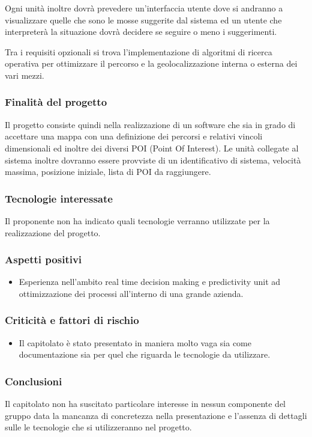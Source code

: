 			Ogni unità inoltre dovrà prevedere un’interfaccia utente dove si andranno a visualizzare quelle che sono le mosse suggerite dal sistema ed un utente che interpreterà la situazione dovrà decidere se seguire o meno i suggerimenti. 
			
			Tra i requisiti opzionali si trova l’implementazione di algoritmi di ricerca operativa per ottimizzare il percorso e la geolocalizzazione interna o esterna dei vari mezzi.
		\subsubsection{Finalità del progetto}
			Il progetto consiste quindi nella realizzazione di un software che sia in grado di accettare una mappa con una definizione dei percorsi e relativi vincoli dimensionali ed inoltre dei diversi POI (Point Of Interest). Le unità collegate al sistema inoltre dovranno essere provviste di un identificativo di sistema, velocità massima, posizione iniziale, lista di POI da raggiungere.
		\subsubsection{Tecnologie interessate}
			Il proponente non ha indicato quali tecnologie verranno utilizzate per la realizzazione del progetto.
			
		\subsubsection{Aspetti positivi}
			\begin{itemize}
				\item Esperienza nell’ambito real time decision making e predictivity unit ad ottimizzazione dei processi all’interno di una grande azienda.
 			\end{itemize}			
		\subsubsection{Criticità e fattori di rischio}
			\begin{itemize}
				\item Il capitolato è stato presentato in maniera molto vaga sia come documentazione sia per quel che riguarda le tecnologie da utilizzare.
			\end{itemize}
		\subsubsection{Conclusioni}
			Il capitolato non ha suscitato particolare interesse in nessun componente del gruppo data la mancanza di concretezza nella presentazione e l’assenza di dettagli sulle le tecnologie che si utilizzeranno nel progetto.
\newpage
				
